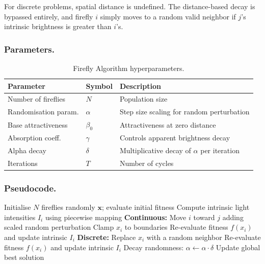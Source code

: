 For discrete problems, spatial distance is undefined. The distance-based decay is bypassed entirely, and firefly $i$ simply moves to a random valid neighbor if $j$'s intrinsic brightness is greater than $i$'s.

\subsubsection{Parameters.}

\begin{table}[htbp]
\centering
\caption{Firefly Algorithm hyperparameters.}
\label{tab:fa-params}
\begin{tabular}{l l p{7cm}}
\hline
\textbf{Parameter} & \textbf{Symbol} & \textbf{Description} \\
\hline
Number of fireflies   & $N$                & Population size \\
Randomisation param.  & $\alpha$           & Step size scaling for random perturbation \\
Base attractiveness   & $\beta_0$          & Attractiveness at zero distance \\
Absorption coeff.     & $\gamma$           & Controls apparent brightness decay \\
Alpha decay           & $\delta$           & Multiplicative decay of $\alpha$ per iteration \\
Iterations            & $T$                & Number of cycles \\
\hline
\end{tabular}
\end{table}

\subsubsection{Pseudocode.}

\begin{algorithm}[H]
\caption{Firefly Algorithm}
\label{alg:fa}
\begin{algorithmic}[1]
  \State Initialise $N$ fireflies randomly $\mathbf{x}$; evaluate initial fitness
  \State Compute intrinsic light intensities $I_i$ using piecewise mapping
        \State \textbf{Continuous:}
          \State Move $i$ toward $j$ adding scaled random perturbation
          \State Clamp $x_i$ to boundaries
          \State Re-evaluate fitness $f(x_i)$ and update intrinsic $I_i$
        \EndIf
        \State \textbf{Discrete:}
          \State Replace $x_i$ with a random neighbor
          \State Re-evaluate fitness $f(x_i)$ and update intrinsic $I_i$
        \EndIf
      \EndFor
    \EndFor
    \State Decay randomness: $\alpha \gets \alpha \cdot \delta$
    \State Update global best solution
  \EndFor
\end{algorithmic}
\end{algorithm}

